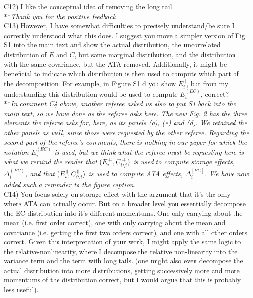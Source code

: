 \documentclass[letterpaper,11pt]{article}
\newcommand{\nat}{%
\text{\hspace{-1.5pt}
\begin{tikzpicture}[scale=1.8]%
\draw (.333ex,0) -- (.333ex,1ex);%
\draw (.666ex,0) -- (.666ex,1ex);
\end{tikzpicture}%
}}
\newcommand{\shp}{%
\text{\hspace{-1.5pt}
\begin{tikzpicture}[scale=1.8]%
\draw (0,.333ex) -- (1ex,.333ex);%
\draw (0,.666ex) -- (1ex,.666ex);%
\draw (.333ex,0) -- (.333ex,1ex);%
\draw (.666ex,0) -- (.666ex,1ex);
\end{tikzpicture}%
}}
\newcommand{\bs}{\backslash}
\begin{document}
\noindent C12) I like the conceptual idea of removing the long tail. \\

\noindent ***\emph{Thank you for the positive feedback.} \\

\noindent C13) However, I have somewhat difficulties to precisely understand/be sure I correctly understood what this does. I suggest you move a simpler version of Fig S1 into the main text and show the actual distribution, the uncorrelated distribution of $E$ and $C$, but same marginal distribution, and the distribution with the same covariance, but the ATA removed. Additionally, it might be beneficial to indicate which distribution is then used to compute which part of the decomposition. For example, in Figure S1 d you show $E_i^{||}$, but from my understanding this distribution would be used to compute $E_i^{(EC)}$, correct? \\

\noindent ***\emph{In comment C4 above, another referee asked us also to put S1 back into the main text, so
we have done as the referee asks here. The new Fig. 2 has the three elements the referee asks for, here, as 
its panels (a), (e) and (d). We retained the other panels as well, since those were requested by the 
other referee. Regarding the second part of the referee's comments, 
there is nothing in our paper for which the notation $E_i^{(EC)}$ is used, but we think what the referee must
be requesting here is what we remind the reader that $(E_i^\shp,C_{i \bs i}^\shp)$ is used to compute storage effects,
$\Delta_i^{(EC)}$, and that $(E_i^\nat,C_{i \bs i}^\nat)$ is used to compute ATA effects, $\Delta_i^{[EC]}$. We have 
now added such a reminder to the figure caption.} \\

\noindent C14) You focus solely on storage effect with the argument that it’s the only where ATA can actually occur. But on a broader level you essentially decompose the EC distribution into it’s different momentums. One only carrying about the mean (i.e. first order correct), one with only carrying about the mean and covariance (i.e. getting the first two orders correct), and one with all other orders correct. Given this interpretation of your work, I might apply the same logic to the relative-nonlinearity, where I decompose the relative non-linearity into the variance term and the term with long tails. (one might also even decompose the actual distribution into more distributions, getting successively more and more momentums of the distribution correct, but I would argue that this is probably less useful). \\
\end{document}
